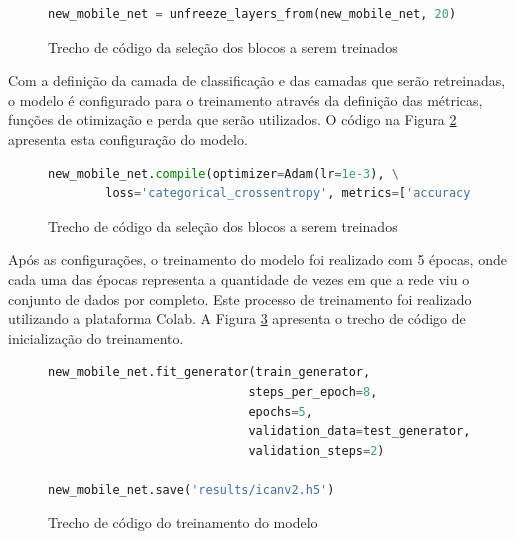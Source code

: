 \begin{figure}[H]
    \centering
    \begin{lstlisting}[language=Python]
new_mobile_net = unfreeze_layers_from(new_mobile_net, 20)
    \end{lstlisting}
    \caption{Trecho de código da seleção dos blocos a serem treinados}
    \label{figure:descongelamento_modelo}
\end{figure}

\par Com a definição da camada de classificação e das camadas que serão retreinadas, o modelo é configurado para o treinamento através da definição das métricas, funções de otimização e perda que serão utilizados. O código na Figura \ref{figure:configuracao_do_modelo_para_treino} apresenta esta configuração do modelo.

\begin{figure}[H]
    \centering
    \begin{lstlisting}[language=Python]
new_mobile_net.compile(optimizer=Adam(lr=1e-3), \
        loss='categorical_crossentropy', metrics=['accuracy'])
    \end{lstlisting}
    \caption{Trecho de código da seleção dos blocos a serem treinados}
    \fonte{Produção do autor}
    \label{figure:configuracao_do_modelo_para_treino}
\end{figure}

\par Após as configurações, o treinamento do modelo foi realizado com 5 épocas, onde cada uma das épocas representa a quantidade de vezes em que a rede viu o conjunto de dados por completo. Este processo de treinamento foi realizado utilizando a plataforma Colab. A Figura \ref{figure:treinamento_do_modelo} apresenta o trecho de código de inicialização do treinamento.

\begin{figure}[H]
    \centering
    \begin{lstlisting}[language=Python]
new_mobile_net.fit_generator(train_generator,
                            steps_per_epoch=8,
                            epochs=5,
                            validation_data=test_generator,
                            validation_steps=2)

new_mobile_net.save('results/icanv2.h5')
    \end{lstlisting}
    \caption{Trecho de código do treinamento do modelo}
    \label{figure:treinamento_do_modelo}
\end{figure}

